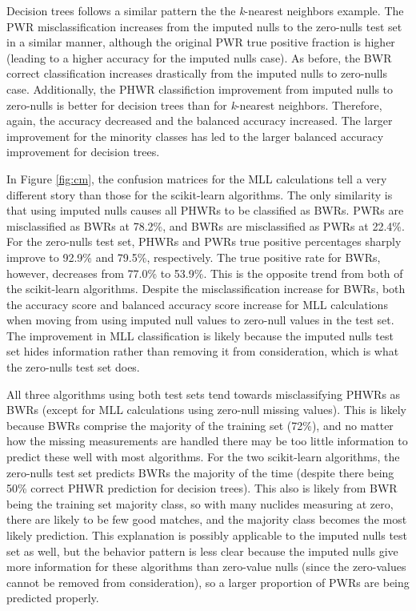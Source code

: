 Decision trees follows a similar pattern the the \textit{k}-nearest neighbors
example.  The \gls{PWR} misclassification increases from the imputed nulls to
the zero-nulls test set in a similar manner, although the original \gls{PWR}
true positive fraction is higher (leading to a higher accuracy for the imputed
nulls case).  As before, the \gls{BWR} correct classification increases
drastically from the imputed nulls to zero-nulls case.  Additionally, the
\gls{PHWR} classifiction improvement from imputed nulls to zero-nulls is better
for decision trees than for \textit{k}-nearest neighbors.  Therefore, again,
the accuracy decreased and the balanced accuracy increased. The larger
improvement for the minority classes has led to the larger balanced accuracy
improvement for decision trees.

In Figure \ref{fig:cm}, the confusion matrices for the \gls{MLL} calculations
tell a very different story than those for the scikit-learn algorithms.  The
only similarity is that using imputed nulls causes all \gls{PHWR}s to be
classified as \gls{BWR}s. \gls{PWR}s are misclassified as \gls{BWR}s at 78.2\%,
and \gls{BWR}s are misclassified as \gls{PWR}s at 22.4\%. For the zero-nulls
test set, \gls{PHWR}s and \gls{PWR}s true positive percentages sharply improve
to 92.9\% and 79.5\%, respectively.  The true positive rate for \gls{BWR}s,
however, decreases from 77.0\% to 53.9\%. This is the opposite trend from both
of the scikit-learn algorithms.  Despite the misclassification increase for
\gls{BWR}s, both the accuracy score and balanced accuracy score increase for
\gls{MLL} calculations when moving from using imputed null values to zero-null
values in the test set. The improvement in \gls{MLL} classification is likely
because the imputed nulls test set hides information rather than removing it
from consideration, which is what the zero-nulls test set does. 

All three algorithms using both test sets tend towards misclassifying
\gls{PHWR}s as \gls{BWR}s (except for \gls{MLL} calculations using zero-null
missing values).  This is likely because \gls{BWR}s comprise the majority of
the training set (72\%), and no matter how the missing measurements are handled
there may be too little information to predict these well with most algorithms.
For the two scikit-learn algorithms, the zero-nulls test set predicts
\gls{BWR}s the majority of the time (despite there being 50\% correct
\gls{PHWR} prediction for decision trees). This also is likely from \gls{BWR}
being the training set majority class, so with many nuclides measuring at zero,
there are likely to be few good matches, and the majority class becomes the
most likely prediction. This explanation is possibly applicable to the imputed
nulls test set as well, but the behavior pattern is less clear because the
imputed nulls give more information for these algorithms than zero-value nulls
(since the zero-values cannot be removed from consideration), so a larger
proportion of \gls{PWR}s are being predicted properly.  

